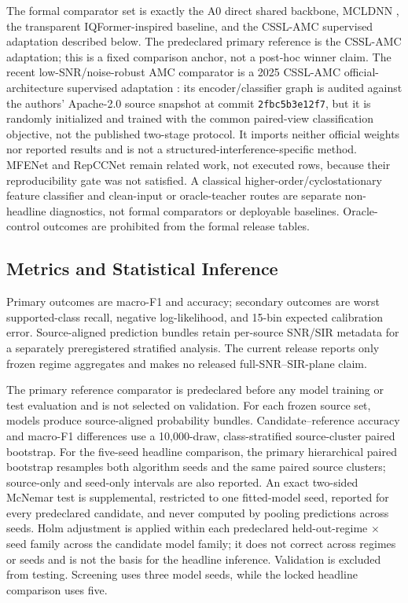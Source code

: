 \documentclass[letterpaper,journal]{IEEEtran}
\begin{document}
The formal comparator set is exactly the A0 direct shared backbone, MCLDNN
\cite{xu2020mcldnn}, the transparent IQFormer-inspired baseline, and the
CSSL-AMC supervised adaptation described below.  The predeclared primary
reference is the CSSL-AMC adaptation; this is a fixed comparison anchor, not a
post-hoc winner claim.  The recent low-SNR/noise-robust AMC
comparator is a 2025 CSSL-AMC
official-architecture supervised adaptation
\cite{du2025contrastive}: its encoder/classifier graph is audited against the
authors' Apache-2.0 source snapshot \cite{du2025csslcode} at commit
\texttt{2fbc5b3e12f7}, but it is randomly
initialized and trained with the common paired-view classification objective,
not the published two-stage protocol.  It imports neither official weights nor
reported results and is not a structured-interference-specific method.  MFENet
\cite{sun2025mfenet} and RepCCNet \cite{tang2024repccnet} remain related work,
not executed rows, because their reproducibility gate was not satisfied.
A classical higher-order/cyclostationary feature classifier and clean-input or
oracle-teacher routes are separate non-headline diagnostics, not formal
comparators or deployable baselines.  Oracle-control outcomes are prohibited
from the formal release tables.

\subsection{Metrics and Statistical Inference}
Primary outcomes are macro-F1 and accuracy; secondary outcomes are worst
supported-class recall, negative log-likelihood, and 15-bin expected
calibration error.  Source-aligned prediction bundles retain per-source
SNR/SIR metadata for a separately preregistered stratified analysis.  The
current release reports only frozen regime aggregates and makes no released
full-SNR--SIR-plane claim.

The primary reference comparator is predeclared before any model training or
test evaluation and is not selected on validation.  For each frozen source
set, models produce source-aligned probability bundles.  Candidate--reference
accuracy and macro-F1 differences use a 10,000-draw, class-stratified
source-cluster paired bootstrap.  For the five-seed headline comparison, the
primary hierarchical paired bootstrap resamples both algorithm seeds and the
same paired source clusters; source-only and seed-only intervals are also
reported.  An exact two-sided McNemar test is supplemental, restricted to one
fitted-model seed, reported for every predeclared candidate, and never computed
by pooling predictions across seeds.  Holm adjustment is applied within each
predeclared held-out-regime \(\times\) seed family across the candidate model
family; it does not correct across regimes or seeds and is not the basis for
the headline inference.  Validation is excluded from testing.  Screening uses
three model seeds, while the locked headline comparison uses five.
\end{document}
